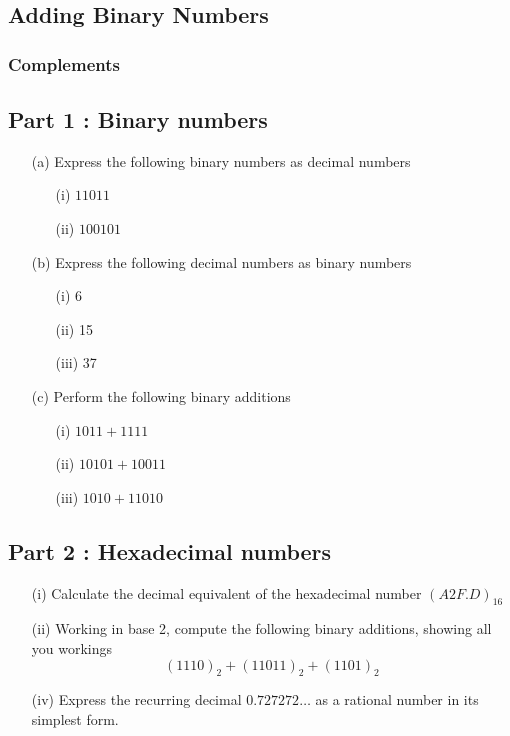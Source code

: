 \documentclass[12pt]{article}
\begin{document}
\subsection*{Adding Binary Numbers}



\subsubsection*{Complements}


\subsection*{Part 1 : Binary numbers}
\begin{itemize}
\item[(a)] Express the following binary numbers as decimal numbers
\begin{itemize}
\item[(i)] $11011$
\item[(ii)] $100101$
\end{itemize}
\item[(b)] Express the following decimal numbers as binary numbers
\begin{itemize}
\item[(i)] 6
\item[(ii)] 15
\item[(iii)] 37
\end{itemize}
\item[(c)] Perform the following binary additions
\begin{itemize}
\item[(i)] $1011+ 1111$
\item[(ii)] $10101  + 10011$
\item[(iii)] $1010 + 11010$
\end{itemize}

\end{itemize}

\subsection*{Part 2 : Hexadecimal numbers}
\begin{itemize}
\item[(i)] Calculate the decimal equivalent of the hexadecimal number $(A2F.D)_{16}$
\item[(ii)] Working in base 2, compute the following binary additions, showing all you workings
\[(1110)_2 + (11011)_2 + (1101)_2 \]
\item[(iv)] Express the recurring decimal $0.727272\ldots$ as a rational number in its simplest form.
\end{itemize}
\end{document}
